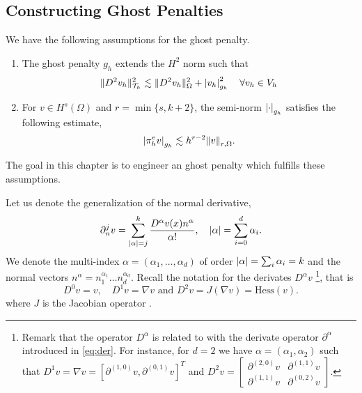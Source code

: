 
\subsection{Constructing Ghost Penalties}%
\label{sec:constructing_ghost_penalties}

We have the following assumptions for the ghost penalty.
\begin{enumerate}[label=\textbf{EP\arabic*}]
    \item \label{as:EP1} The ghost penalty $g_{h}$ extends the $H^{2}$ norm such that
        \begin{equation}
    \| D^2v_{h} \|_{ \mathcal{T} _{h} }^{ 2 }  \lesssim \| D^2 v_{h} \|_{ \Omega  }^{  2} + \left\lvert  v_{h}  \right\rvert _{g_{h}}^2 \quad \forall v_{h} \in V_{h}
        \end{equation}
\item \label{as:EP2} For $v \in H^{s}( \Omega ) $ and $r = \min \{s,k+2 \} $, the semi-norm $\left\lvert  \cdot   \right\rvert_{g_{h}} $ satisfies the following estimate, \[
    \left\lvert  \pi _{h}^{e} v  \right\rvert _{g_{h}} \lesssim  h^{r-2} \| v \|_{ r,\Omega  }^{  }.
    \]
\end{enumerate}
The goal in this chapter is to engineer an ghost penalty which fulfills these assumptions.

Let us denote the generalization of the normal derivative,
\begin{equation}
\partial _{n}^{j} v = \sum_{\left\lvert  \alpha   \right\rvert =j }^{k} \frac{D ^{\alpha }v( x) n^{\alpha }}{\alpha !}, \quad \left\lvert  \alpha   \right\rvert = \sum_{i=0}^{d} \alpha_{i}.
\end{equation}
We denote the multi-index $\alpha  = ( \alpha _{1}, \ldots, \alpha _{d})  $ of order $\left\lvert  \alpha   \right\rvert = \sum_{i}^{}  \alpha _{i} = k $   and the normal vectors $n^{\alpha } = n_{1}^{\alpha _{1}} \ldots n_{d}^{\alpha _{d}}$.
Recall the notation for the derivates $D^{\alpha } v$
\footnote{
Remark that the operator $D^{\alpha }$  is related to with the derivate operator $\partial ^{\alpha } $ introduced in \eqref{eq:der}. For instance, for $d=2$ we have $\alpha = ( \alpha _{1}, \alpha _{2}) $  such that $ D^{1} v =  \nabla v  = \left[ \partial ^{( 1,0 )} v,\partial ^{( 0,1 )}v
\right]^{T}$ and $   D^2 v  = \begin{bmatrix}
\partial ^{( 2,0 )} v &  \partial ^{( 1,1) }v \\
\partial ^{( 1,1 )} v &  \partial ^{( 0,2) }v
\end{bmatrix}
 $.
},
that is
\begin{equation}
D ^{0} v  = v, \quad   D ^{1}v  = \nabla v \text{ and }  D ^{2} v  = J(\nabla v) = \mathrm{Hess}(v).
\end{equation}
where $J$ is the Jacobian operator .

